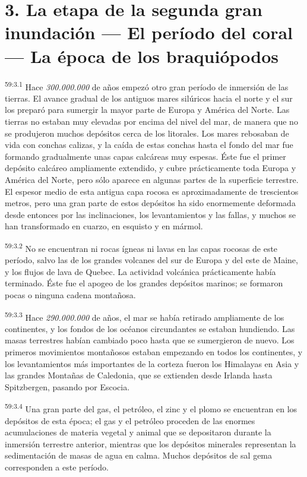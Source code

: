 \section*{3. La etapa de la segunda gran inundación --- El período del coral --- La época de los braquiópodos}
\par
\textsuperscript{59:3.1} Hace \textit{300.000.000} de años empezó otro gran período de inmersión de las tierras. El avance gradual de los antiguos mares silúricos hacia el norte y el sur los preparó para sumergir la mayor parte de Europa y América del Norte. Las tierras no estaban muy elevadas por encima del nivel del mar, de manera que no se produjeron muchos depósitos cerca de los litorales. Los mares rebosaban de vida con conchas calizas, y la caída de estas conchas hasta el fondo del mar fue formando gradualmente unas capas calcáreas muy espesas. Éste fue el primer depósito calcáreo ampliamente extendido, y cubre prácticamente toda Europa y América del Norte, pero sólo aparece en algunas partes de la superficie terrestre. El espesor medio de esta antigua capa rocosa es aproximadamente de trescientos metros, pero una gran parte de estos depósitos ha sido enormemente deformada desde entonces por las inclinaciones, los levantamientos y las fallas, y muchos se han transformado en cuarzo, en esquisto y en mármol.

\par
\textsuperscript{59:3.2} No se encuentran ni rocas ígneas ni lavas en las capas rocosas de este período, salvo las de los grandes volcanes del sur de Europa y del este de Maine, y los flujos de lava de Quebec. La actividad volcánica prácticamente había terminado. Éste fue el apogeo de los grandes depósitos marinos; se formaron pocas o ninguna cadena montañosa.

\par
\textsuperscript{59:3.3} Hace \textit{290.000.000} de años, el mar se había retirado ampliamente de los continentes, y los fondos de los océanos circundantes se estaban hundiendo. Las masas terrestres habían cambiado poco hasta que se sumergieron de nuevo. Los primeros movimientos montañosos estaban empezando en todos los continentes, y los levantamientos más importantes de la corteza fueron los Himalayas en Asia y las grandes Montañas de Caledonia, que se extienden desde Irlanda hasta Spitzbergen, pasando por Escocia.

\par
\textsuperscript{59:3.4} Una gran parte del gas, el petróleo, el zinc y el plomo se encuentran en los depósitos de esta época; el gas y el petróleo proceden de las enormes acumulaciones de materia vegetal y animal que se depositaron durante la inmersión terrestre anterior, mientras que los depósitos minerales representan la sedimentación de masas de agua en calma. Muchos depósitos de sal gema corresponden a este período.

